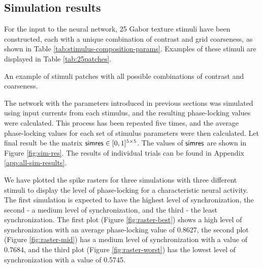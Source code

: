 \subsection{Simulation results}

For the input to the neural network, 25 Gabor texture stimuli have been constructed, each with a unique combination of contrast and grid coarseness, as shown in Table \ref{tab:stimulus-composition-params}. Examples of these stimuli are displayed in Table \ref{tab:25patches}.
\begin{table}[!hpt]
    \centering
    
    \caption[All stimuli examples]{An example of stimuli patches with all possible combinations of contrast and coarseness.}
    \label{tab:25patches}
\end{table}

The network with the parameters introduced in previous sections was simulated using input currents from each stimulus, and the resulting phase-locking values were calculated. This process has been repeated five times, and the average phase-locking values for each set of stimulus parameters were then calculated. Let final result be the matrix $\mathsf{simres} \in [0, 1]^{5 \times 5}$.
The values of $\mathsf{simres}$ are shown in Figure \ref{fig:sim-res}. The results of individual trials can be found in Appendix \ref{app:all-sim-results}.

We have plotted the spike rasters for three simulations with three different stimuli to display the level of phase-locking for a characteristic neural activity. The first simulation is expected to have the highest level of synchronization, the second - a medium level of synchronization, and the third - the least synchronization. The first plot (Figure \ref{fig:raster-best}) shows a high level of synchronization with an average phase-locking value of 0.8627, the second plot (Figure \ref{fig:raster-mid}) has a medium level of synchronization with a value of 0.7684, and the third plot (Figure \ref{fig:raster-worst}) has the lowest level of synchronization with a value of 0.5745.

